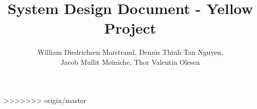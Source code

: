 \documentclass{article}
\title{System Design Document - Yellow Project}
\author{William Diedrichsen Marstrand, Dennis Thinh Tan Nguyen, 
\\Jacob Mullit Møiniche, Thor Valentin Olesen}
\begin{document}
\maketitle



>>>>>>> origin/master
\end{document}
